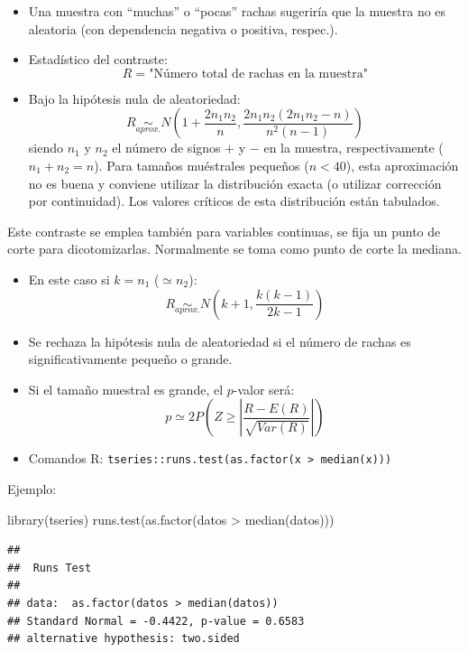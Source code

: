 \documentclass[
]{book}
\newenvironment{Shaded}{\begin{snugshade}}{\end{snugshade}}
\newcommand{\FunctionTok}[1]{\textcolor[rgb]{0.00,0.00,0.00}{#1}}
\newcommand{\NormalTok}[1]{#1}
\newcommand{\SpecialCharTok}[1]{\textcolor[rgb]{0.00,0.00,0.00}{#1}}
\theoremstyle{break}
\theoremstyle{nonumberplain}
\begin{document}
\begin{itemize}
\item
  Una muestra con ``muchas'' o ``pocas'' rachas sugeriría que la muestra
  no es aleatoria (con dependencia negativa o positiva, respec.).
\item
  Estadístico del contraste:
  \[R=\text{"Número total de rachas en la muestra"}\]
\item
  Bajo la hipótesis nula de aleatoriedad:
  \[R\underset{aprox.}{\sim}N\left(  1+\frac{2n_{1}n_{2}}{n},
  \frac{2n_{1}n_{2}(2n_{1}n_{2}-n)}{n^{2}(n-1)}\right)\]
  siendo \(n_{1}\) y \(n_{2}\) el número de signos \(+\) y \(-\) en la muestra,
  respectivamente (\(n_{1}+n_{2}=n\)).
  Para tamaños muéstrales pequeños (\(n<40\)), esta aproximación
  no es buena y conviene utilizar la distribución exacta (o utilizar
  corrección por continuidad). Los valores críticos de esta
  distribución están tabulados.
\end{itemize}

Este contraste se emplea también para variables continuas, se fija
un punto de corte para dicotomizarlas. Normalmente se toma como punto de corte la mediana.

\begin{itemize}
\item
  En este caso si \(k=n_{1}\) (\(\simeq n_{2}\)):
  \[R\underset{aprox.}{\sim}N\left(  k+1,\frac{k(k-1)}{2k-1}\right)\]
\item
  Se rechaza la hipótesis nula de aleatoriedad si el número de rachas
  es significativamente pequeño o grande.
\item
  Si el tamaño muestral es grande, el \(p\)-valor será:
  \[p \simeq 2 P\left( Z \geq \left\vert 
  \frac{R-E(R)}{\sqrt{Var(R)}} \right\vert \right)\]
\item
  Comandos R: \texttt{tseries::runs.test(as.factor(x\ \textgreater{}\ median(x)))}
\end{itemize}

Ejemplo:

\begin{Shaded}
\begin{Highlighting}[]
\FunctionTok{library}\NormalTok{(tseries)}
\FunctionTok{runs.test}\NormalTok{(}\FunctionTok{as.factor}\NormalTok{(datos }\SpecialCharTok{\textgreater{}} \FunctionTok{median}\NormalTok{(datos)))}
\end{Highlighting}
\end{Shaded}

\begin{verbatim}
## 
##  Runs Test
## 
## data:  as.factor(datos > median(datos))
## Standard Normal = -0.4422, p-value = 0.6583
## alternative hypothesis: two.sided
\end{verbatim}
\end{document}
